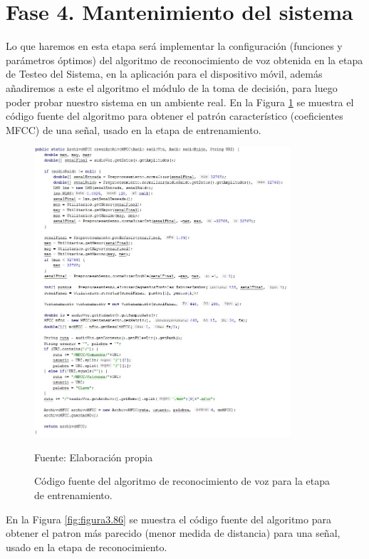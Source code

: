 \section{Fase 4. Mantenimiento del sistema}
Lo que haremos en esta etapa será implementar la configuración (funciones y parámetros óptimos) del algoritmo de reconocimiento de voz obtenida en la etapa de Testeo del Sistema, en la aplicación para el dispositivo móvil, además añadiremos a este el algoritmo el módulo de la toma de decisión, para luego poder probar nuestro sistema en un ambiente real.
\vskip 0.5cm
En la Figura \ref{fig:figura3.85} se muestra el código fuente del algoritmo para obtener el patrón característico (coeficientes MFCC) de una señal, usado en la etapa de entrenamiento.
\begin{figure}[H]
\captionsetup{justification=centering}
\begin{center}
\includegraphics[width=0.85\textwidth]{Imagenes/Cap3/image085}
\end{center}
\begin{center}
\vskip -0.5cm
\caption{\small{Código fuente del algoritmo de reconocimiento de voz para la etapa de entrenamiento.}}
\label{fig:figura3.85}
{\small{Fuente: Elaboración propia}}
\end{center}
\end{figure}
\newpage
En la Figura \ref{fig:figura3.86} se muestra el código fuente del algoritmo para obtener el patron más parecido (menor medida de distancia) para una señal, usado en la etapa de reconocimiento.

